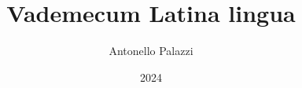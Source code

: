 \documentclass[a4paper, 12pt, twoside]{report}
\begin{document}
\author{Antonello Palazzi}
\title{Vademecum Latina lingua}
\date{2024}
\maketitle
\tableofcontents
\clearpage



\end{document}
